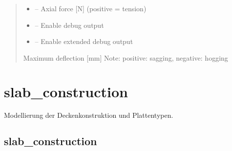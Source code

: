 \documentclass[a4paper,11pt,german]{sphinxmanual}
\begin{document}
\begin{fulllineitems}
\begin{fulllineitems}
\begin{quote}
\begin{description}
\begin{itemize}
\item {} 
\sphinxAtStartPar
{} – Axial force {[}N{]} (positive = tension)

\item {} 
\sphinxAtStartPar
{} – Enable debug output

\item {} 
\sphinxAtStartPar
{} – Enable extended debug output

\end{itemize}

\sphinxAtStartPar
Maximum deflection {[}mm{]} Note: positive: sagging, negative: hogging

\end{description}\end{quote}

\end{fulllineitems}


\end{fulllineitems}


\sphinxstepscope


\chapter{slab\_construction}
\label{\detokenize{api/slab_construction:slab-construction}}\label{\detokenize{api/slab_construction::doc}}
\sphinxAtStartPar
Modellierung der Deckenkonstruktion und Plattentypen.


\section{slab\_construction}
\label{\detokenize{api/slab_construction:id1}}\label{\detokenize{api/slab_construction:module-slab_construction.slab_construction}}
\end{document}
